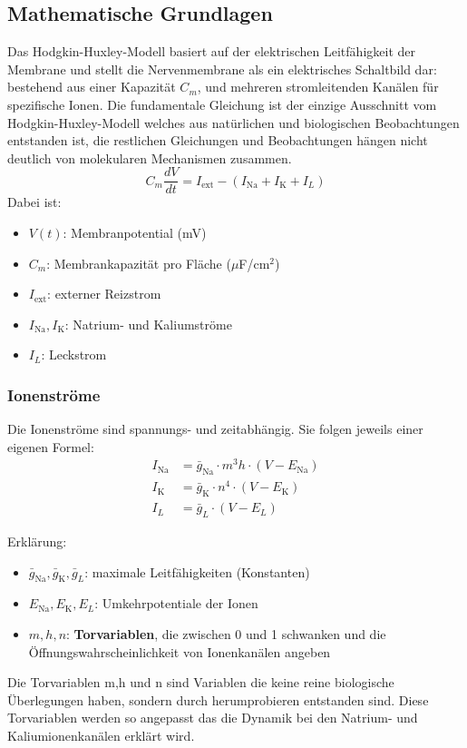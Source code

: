 \begin{refsection}
\subsection{Mathematische Grundlagen}
Das Hodgkin-Huxley-Modell basiert auf der elektrischen Leitfähigkeit der Membrane und stellt die Nervenmembrane als ein elektrisches Schaltbild dar: bestehend aus einer Kapazität $C_m$, und mehreren stromleitenden Kanälen für spezifische Ionen.
Die fundamentale Gleichung ist der einzige Ausschnitt vom Hodgkin-Huxley-Modell welches aus natürlichen und biologischen Beobachtungen entstanden ist, die restlichen Gleichungen und Beobachtungen hängen nicht deutlich von molekularen Mechanismen zusammen.
\[C_m \frac{dV}{dt} = I_{\text{ext}} - (I_{\text{Na}} + I_{\text{K}} + I_L)\]
Dabei ist:

\begin{itemize}
	\item $V(t)$: Membranpotential (mV)
	\item $C_m$: Membrankapazität pro Fläche ($\mu$F/cm$^2$)
	\item $I_{\text{ext}}$: externer Reizstrom
	\item $I_{\text{Na}}, I_{\text{K}}$: Natrium- und Kaliumströme
	\item $I_L$: Leckstrom
\end{itemize}
\subsubsection{Ionenströme}
Die Ionenströme sind spannungs- und zeitabhängig. Sie folgen jeweils einer eigenen Formel:
\[
\begin{aligned}
	I_{\text{Na}} &= \bar{g}_{\text{Na}} \cdot m^3 h \cdot (V - E_{\text{Na}}) \\
	I_{\text{K}} &= \bar{g}_{\text{K}} \cdot n^4 \cdot (V - E_{\text{K}}) \\
	I_L &= \bar{g}_L \cdot (V - E_L)
\end{aligned}
\]

Erklärung:

\begin{itemize}
	\item $\bar{g}_{\text{Na}}, \bar{g}_{\text{K}}, \bar{g}_L$: maximale Leitfähigkeiten (Konstanten)
	\item $E_{\text{Na}}, E_{\text{K}}, E_L$: Umkehrpotentiale der Ionen
	\item $m, h, n$: \textbf{Torvariablen}, die zwischen 0 und 1 schwanken und die Öffnungswahrscheinlichkeit von Ionenkanälen angeben
\end{itemize}
Die Torvariablen m,h und n sind Variablen die keine reine biologische Überlegungen haben, sondern durch herumprobieren entstanden sind. Diese Torvariablen werden so angepasst das die Dynamik bei den Natrium- und Kaliumionenkanälen erklärt wird.

\end{refsection}
